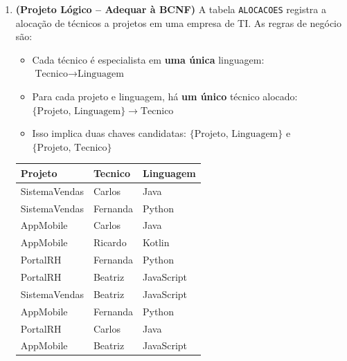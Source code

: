 \documentclass[12pt]{article}
\begin{document}
\begin{enumerate}[label=\textbf{Questão \arabic*:}, leftmargin=*]
  \item \textbf{(Projeto Lógico -- Adequar à BCNF)} A tabela \texttt{ALOCACOES} registra a alocação de técnicos a projetos em uma empresa de TI. As regras de negócio são:
  \begin{itemize}
    \item Cada técnico é especialista em \textbf{uma única} linguagem: $\text{Tecnico} \to \text{Linguagem}$
    \item Para cada projeto e linguagem, há \textbf{um único} técnico alocado: $\{\text{Projeto, Linguagem}\} \to \text{Tecnico}$
    \item Isso implica duas chaves candidatas: $\{\text{Projeto, Linguagem}\}$ e $\{\text{Projeto, Tecnico}\}$
  \end{itemize}

  \vspace{0.2cm}
  \centering
  \begin{tabular}{|l|l|l|}
    \hline
    \textbf{Projeto} & \textbf{Tecnico} & \textbf{Linguagem} \\ \hline
    SistemaVendas   & Carlos   & Java       \\ \hline
    SistemaVendas   & Fernanda & Python     \\ \hline
    AppMobile       & Carlos   & Java       \\ \hline
    AppMobile       & Ricardo  & Kotlin     \\ \hline
    PortalRH        & Fernanda & Python     \\ \hline
    PortalRH        & Beatriz  & JavaScript \\ \hline
    SistemaVendas   & Beatriz  & JavaScript \\ \hline
    AppMobile       & Fernanda & Python     \\ \hline
    PortalRH        & Carlos   & Java       \\ \hline
    AppMobile       & Beatriz  & JavaScript \\ \hline
  \end{tabular}
  \flushleft
  \vspace{0.2cm}


\end{enumerate}
\end{document}
